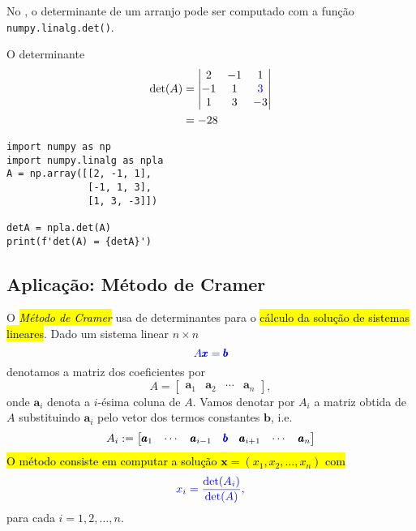 No {\numpy}, o determinante de um arranjo pode ser computado com a função \lstinline+numpy.linalg.det()+.

\begin{ex}
  O determinante
  \begin{subequations}
    \begin{align}
      \det(A) &=
                \begin{vmatrix}
                  2 & -1 & 1\\
                  -1 & 1 & {\color{blue}3}\\
                  1 & 3 & -3
                \end{vmatrix}\\
              &= -28
    \end{align}
  \end{subequations}

\begin{lstlisting}
import numpy as np
import numpy.linalg as npla
A = np.array([[2, -1, 1],
              [-1, 1, 3],
              [1, 3, -3]])

detA = npla.det(A)
print(f'det(A) = {detA}')
\end{lstlisting}

\end{ex}

\subsection{Aplicação: Método de Cramer}

O \hl{\emph{Método de Cramer}}{\cramer} usa de determinantes para o \hl{cálculo da solução de sistemas lineares}. Dado um sistema linear $n\times n$
\begin{equation}\color{blue}A\pmb{x} = \pmb{b}
\end{equation}
denotamos a matriz dos coeficientes por
\begin{equation}
  A =
  \begin{bmatrix}
    \pmb{a}_1 & \pmb{a}_2 & \cdots & \pmb{a}_n
\end{bmatrix},
\end{equation}
onde $\pmb{a}_i$ denota a $i$-ésima coluna de $A$. Vamos denotar por $A_i$ a matriz obtida de $A$ substituindo $\pmb{a}_i$ pelo vetor dos termos constantes $\pmb{b}$, i.e.
\begin{equation}
  A_i :=
  \begin{bmatrix}
    \pmb{a}_1 & \cdots & \pmb{a}_{i-1} & {\color{blue}\pmb{b}} & \pmb{a}_{i+1} & \cdots & \pmb{a}_n
  \end{bmatrix}
\end{equation}
\hl{O método consiste em computar a solução $\pmb{x} = (x_1, x_2, \ldots, x_n)$ com}
\begin{equation}\color{blue}x_i = \frac{\det(A_i)}{\det(A)},
\end{equation}
para cada $i = 1, 2, \dotsc, n$.

